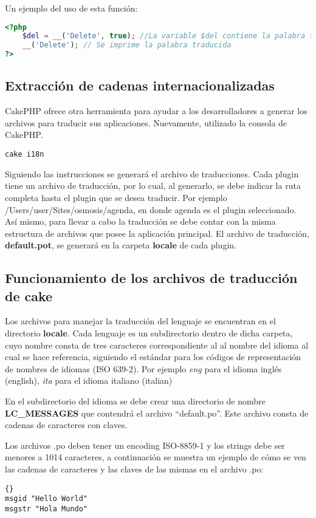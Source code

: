 Un ejemplo del uso de esta función:
\begin{lstlisting}[language=PHP]
<?php
	$del = __('Delete', true); //La variable $del contiene la palabra traducida
	__('Delete'); // Se imprime la palabra traducida
?>
\end{lstlisting}

\subsection{Extracción de cadenas internacionalizadas}
CakePHP ofrece otra herramienta para ayudar a los desarrolladores a generar los archivos para traducir sus aplicaciones. Nuevamente, utilizado la consola de CakePHP.

\begin{lstlisting}
cake i18n
\end{lstlisting}

Siguiendo las instrucciones se generará el archivo de traducciones.
Cada plugin tiene un archivo de traducción, por lo cual, al generarlo, se debe indicar la ruta completa hasta el plugin que se desea traducir. Por ejemplo /Users/user/Sites/osmosis/agenda, en donde agenda es el plugin seleccionado. Así mismo, para llevar a cabo la traducción se debe contar con la misma estructura de archivos que posee la aplicación principal.
El archivo de traducción, \textbf{default.pot}, se generará en la carpeta \textbf{locale} de cada plugin.


\subsection{Funcionamiento de los archivos de traducción de cake}
Los archivos para manejar la traducción del lenguaje se encuentran en el directorio \textbf{locale}. Cada lenguaje es un subdirectorio dentro de dicha carpeta, cuyo nombre consta de tres caracteres correspondiente al al nombre del idioma al cual se hace referencia, siguiendo el estándar para los códigos de representación de nombres de idiomas (ISO 639-2)\citep{MAN_INT}. Por ejemplo \emph{eng} para el idioma inglés (english), \emph{ita} para el idioma italiano (italian)

En el subdirectorio del idioma se debe crear una directorio de nombre \textbf{LC\_MESSAGES} que contendrá el archivo ``default.po''. Este archivo consta de cadenas de caracteres con claves. 

Los archivos .po deben tener un encoding ISO-8859-1 y los strings debe ser menores a 1014 caracteres, a continuación se muestra un ejemplo de cómo se ven las cadenas de caracteres y las claves de las mismas en el archivo .po: 
\begin{lstlisting}{}
msgid "Hello World"
msgstr "Hola Mundo"
\end{lstlisting}

